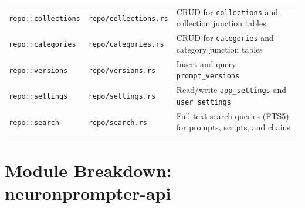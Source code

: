 \documentclass[a4paper, 11pt, oneside]{report}
\begin{document}
\begin{table}[H]
\begin{tabularx}{\textwidth}{l l X}
    \texttt{repo::collections}& \texttt{repo/collections.rs}  & CRUD for \texttt{collections} and
                                                           collection junction tables \\
    \texttt{repo::categories} & \texttt{repo/categories.rs}   & CRUD for \texttt{categories} and
                                                           category junction tables \\
    \texttt{repo::versions}   & \texttt{repo/versions.rs}     & Insert and query \texttt{prompt\_versions} \\
    \texttt{repo::settings}   & \texttt{repo/settings.rs}     & Read/write \texttt{app\_settings} and
                                                           \texttt{user\_settings} \\
    \texttt{repo::search}     & \texttt{repo/search.rs}       & Full-text search queries (FTS5) for
                                                           prompts, scripts, and chains \\
    \bottomrule
  \end{tabularx}
\end{table}

\section{Module Breakdown: neuronprompter-api}
\label{sec:mod-api}
\end{document}

